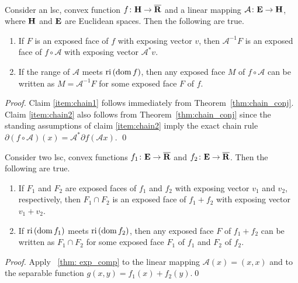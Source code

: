 \documentclass[smallextended,numbook]{svjour3}
\begin{document}
\begin{thm}\label{thm: exp_comp}
{\hfill \\}
Consider an lsc, convex function $f\colon{\bf H}\to\overline{{\bf R}}$ and a linear mapping $\mathcal{A}\colon{{\bf E}}\to{\bf H}$, where ${\bf H}$ and ${{\bf E}}$ are Euclidean spaces. Then the following are true.
\begin{enumerate}
\item If $F$ is an exposed face of $f$ with exposing vector $v$, then ${\mathcal{A}}^{-1}F$ is an exposed face of $f\circ {\mathcal{A}}$ with exposing vector ${\mathcal{A}}^{*}v$.\label{item:chain1}
\item If the range of ${\mathcal{A}}$ meets ${\mbox{\rm ri}\,}({\mbox{\rm dom}\,} f)$, then any exposed face $M$ of $f\circ{\mathcal{A}}$ can be written as $M={\mathcal{A}}^{-1}F$ for some exposed face $F$ of $f$. \label{item:chain2}
\end{enumerate}
\end{thm}
\begin{proof}
Claim \ref{item:chain1} follows immediately from Theorem~\ref{thm:chain_conj}. Claim \ref{item:chain2} also follows from Theorem~\ref{thm:chain_conj} since the standing assumptions of claim \ref{item:chain2} imply the exact chain rule $\partial (f\circ{\mathcal{A}})(x)={\mathcal{A}}^{*}\partial f({\mathcal{A}} x)$. 
\qed
\end{proof}

\begin{cor}\label{cor: sum}
Consider two lsc, convex functions $f_1\colon{{\bf E}}\to\overline{{\bf R}}$ and $f_2\colon{{\bf E}}\to\overline{{\bf R}}$.
Then the following are true.
\begin{enumerate}
\item If $F_1$ and $F_2$ are exposed faces of $f_1$ and $f_2$ with exposing vector $v_1$ and $v_2$, respectively, then $F_1\cap F_2$ is an exposed face of $f_1+f_2$ with exposing vector $v_1+v_2$.
\item If ${\mbox{\rm ri}\,} ({\mbox{\rm dom}\,} f_1)$ meets ${\mbox{\rm ri}\,}({\mbox{\rm dom}\,} f_2)$, then any exposed face $F$ of $f_1+f_2$ can be written as $F_1\cap F_2$ for some exposed face $F_1$ of $f_1$ and $F_2$ of $f_2$.
\end{enumerate}
\end{cor}
\begin{proof}
Apply ~\ref{thm: exp_comp} to the linear mapping ${\mathcal{A}} (x)=(x,x)$ and to the separable function $g(x,y)=f_1(x)+f_2(y)$.\qed
\end{proof}
\end{document}

